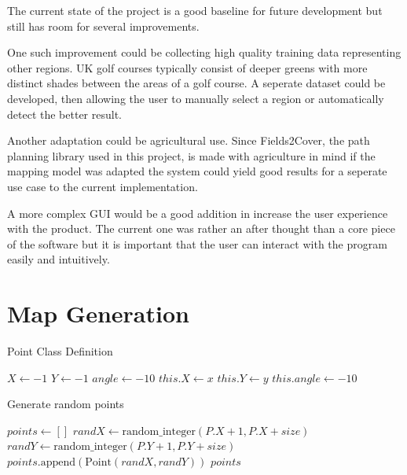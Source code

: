 \documentclass[final]{cmpreport_02}
\begin{document}
The current state of the project is a good baseline for future development but still has room for several improvements.

One such improvement could be collecting high quality training data representing other regions. UK golf courses typically consist of deeper greens with more distinct shades between the areas of a golf course. A seperate dataset could be developed, then allowing the user to manually select a region or automatically detect the better result.

Another adaptation could be agricultural use. 
Since Fields2Cover, the path planning library used in this project, is made with agriculture in mind if the mapping model was adapted the system could yield good results for a seperate use case to the current implementation.

A more complex GUI would be a good addition in increase the user experience with the product. The current one was rather an after thought than a core piece of the software but it is important that the user can interact with the program easily and intuitively.



\clearpage


% 

\appendix
\clearpage

\section{Map Generation}

\begin{algorithm}[h!]
	\caption{Point Class Definition}
	\label{mg:point class}
	\begin{algorithmic}[1]
		\State $X \gets -1$ 
		\State $Y \gets -1$ 
		\State $angle \gets -10$ 
		\State $this.X \gets x$
		\State $this.Y \gets y$
		\State $this.angle \gets -10$ 
		\EndProcedure
		\EndProcedure
	\end{algorithmic}
\end{algorithm}

\begin{algorithm}[h!]
	\caption{Generate random points}
	\label{mg:genPoints}
	\begin{algorithmic}[1]
		\State $points \gets []$
		\State $randX \gets \text{random\_integer}(P.X + 1, P.X + size)$
		\State $randY \gets \text{random\_integer}(P.Y + 1, P.Y + size)$
		\State $points.\text{append}(\text{Point}(randX, randY))$
		\EndFor
		\State \Return $points$
		\EndFunction
	\end{algorithmic}
\end{algorithm}
\end{document}
